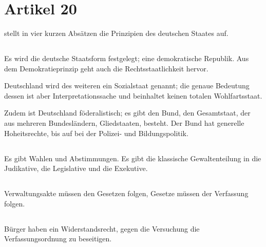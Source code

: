 \documentclass{article}
\begin{document}
\section{Artikel 20 \GG} 
 \GG stellt in vier kurzen Absätzen die Prinzipien des deutschen Staates auf.

\subsection{}
Es wird die deutsche Staatsform festgelegt; eine demokratische Republik. Aus dem Demokratieprinzip geht auch \ua die Rechtsstaatlichkeit hervor.

Deutschland wird des weiteren ein Sozialstaat genannt; die genaue Bedeutung dessen ist aber Interpretationssache und beinhaltet \idr keinen totalen Wohlfartsstaat.

Zudem ist Deutschland föderalistisch; es gibt den Bund, den \sog Gesamtstaat, der aus mehreren Bundesländern, \sog Gliedstaaten, besteht. Der Bund hat generelle Hoheitsrechte, bis auf bei \zb der Polizei- und Bildungspolitik.

\subsection{}
Es gibt Wahlen und Abstimmungen. Es gibt die klassische Gewaltenteilung in die Judikative, die Legislative und die Exekutive.

\subsection{}
Verwaltungsakte müssen den Gesetzen folgen, Gesetze müssen der Verfassung folgen.

\subsection{}
Bürger haben ein Widerstandsrecht, gegen die Versuchung die Verfassungsordnung zu beseitigen.
\end{document}
